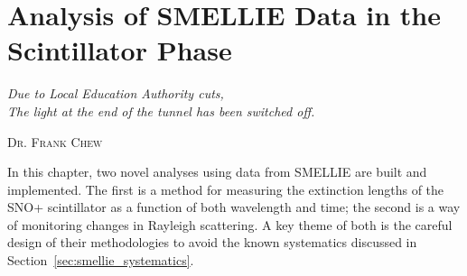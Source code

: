 \chapter{Analysis of SMELLIE Data in the Scintillator Phase}\label{chap:smellie_analysis}
\setlength{\epigraphwidth}{.5\textwidth}
\epigraph{\textit{Due to Local Education Authority cuts,\\The light at the end of the tunnel has been switched off.}}{\textsc{Dr. Frank Chew}}
\setlength{\epigraphwidth}{.4\textwidth}

In this chapter, two novel analyses using data from SMELLIE are built and implemented. The first is a method for measuring the extinction lengths of the SNO+ scintillator as a function of both wavelength and time; the second is a way of monitoring changes in Rayleigh scattering. A key theme of both is the careful design of their methodologies to avoid the known systematics discussed in Section~\ref{sec:smellie_systematics}.

